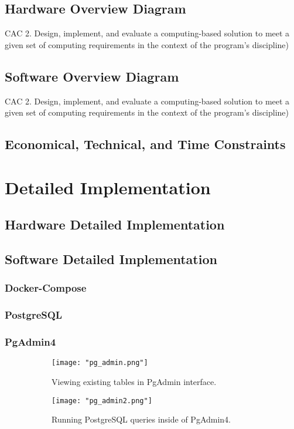 \documentclass{article}
\begin{document}
\subsection{Hardware Overview Diagram} 
CAC 2. Design, implement, and evaluate a 
    computing-based solution to meet a given set of computing requirements in 
    the context of the program’s discipline) 

\subsection{Software Overview Diagram} 
CAC 2. Design, implement, and evaluate a 
    computing-based solution to meet a given set of computing requirements in the 
    context of the program’s discipline) 

\subsection{Economical, Technical, and Time Constraints}  

\section{Detailed Implementation} 

\subsection{Hardware Detailed Implementation}

\subsection{Software Detailed Implementation}
\subsubsection{Docker-Compose}
\subsubsection{PostgreSQL}
\subsubsection{PgAdmin4}
\begin{figure}[h!]
    \centering
    \begin{subfigure}[b]{.45\textwidth}
        \centering
        \texttt{[image: "pg\_admin.png"]}
        \caption{Viewing existing tables in PgAdmin interface.}
        \label{fig:pg_admin_tables}
    \end{subfigure}
    \begin{subfigure}[b]{.45\textwidth}
        \centering
        \texttt{[image: "pg\_admin2.png"]}
        \caption{Running PostgreSQL queries inside of PgAdmin4.}
        \label{fig:pg_admin_queries}
    \end{subfigure}
    \caption{}
    \label{fig:pg_admin_figs}
\end{figure}
\end{document}
